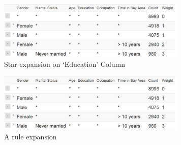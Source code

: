 \begin{figure}
\vspace{-5pt}
\centering
\includegraphics[width=90mm]{graphs/screenshots6col/empty_expansion.jpg}
\vspace{-10pt}
\caption{Star expansion on `Education' Column \label{fig:uiexamplestar}}
\vspace{-15pt}
\end{figure}

\begin{figure}
\vspace{-5pt}
\centering
\includegraphics[width=90mm]{graphs/screenshots6col/empty_expansion.jpg}
\vspace{-10pt}
\caption{A rule expansion \label{fig:uiexamplerule}}
\vspace{-15pt}
\end{figure}


